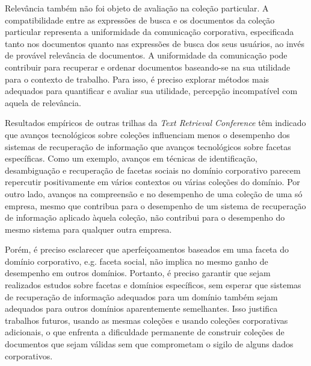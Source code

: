 

Relevância também não foi objeto de avaliação na coleção particular. A compatibilidade entre as expressões de busca e os documentos da coleção particular representa a uniformidade da comunicação corporativa, especificada tanto nos documentos quanto nas expressões de busca dos seus usuários, ao invés de provável relevância de documentos. A uniformidade da comunicação pode contribuir para recuperar e ordenar documentos baseando-se na sua utilidade para o contexto de trabalho. Para isso, é preciso explorar métodos mais adequados para quantificar e avaliar sua utilidade, percepção incompatível com aquela de relevância.%

Resultados empíricos de outras trilhas da \textit{Text Retrieval Conference} têm indicado que avanços tecnológicos sobre coleções influenciam menos o desempenho dos sistemas de recuperação de informação que avanços tecnológicos sobre facetas específicas. Como um exemplo, avanços em técnicas de identificação, desambiguação e recuperação de facetas sociais no domínio corporativo parecem repercutir positivamente em vários contextos ou várias coleções do domínio. Por outro lado, avanços na compreensão e no desempenho de uma coleção de uma só empresa, mesmo que contribua para o desempenho de um sistema de recuperação de informação aplicado àquela coleção, não contribui para o desempenho do mesmo sistema para qualquer outra empresa.

Porém, é preciso esclarecer que aperfeiçoamentos baseados em uma faceta do domínio corporativo, e.g. faceta social, não implica no mesmo ganho de desempenho em outros domínios. Portanto, é preciso garantir que sejam realizados estudos sobre facetas e domínios específicos, sem esperar que sistemas de recuperação de informação adequados para um domínio também sejam adequados para outros domínios aparentemente semelhantes. Isso justifica trabalhos futuros, usando as mesmas coleções e usando coleções corporativas adicionais, o que enfrenta a dificuldade permanente de construir coleções de documentos que sejam válidas sem que comprometam o sigilo de alguns dados corporativos.

